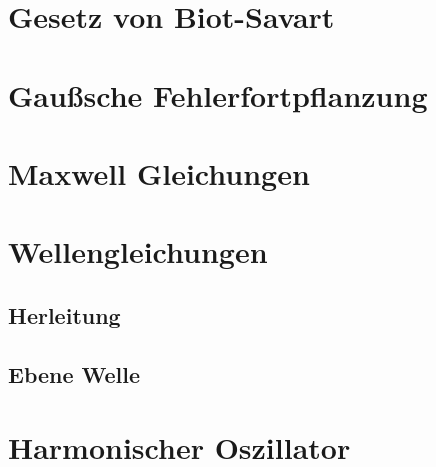 



  \maketitle
  \tableofcontents
  \newpage

    \section{Gesetz von Biot-Savart}
      

    \section{Gaußsche Fehlerfortpflanzung}
      

    \section{Maxwell Gleichungen}
      

    \section{Wellengleichungen}

      \subsection{Herleitung}
        
      \subsection{Ebene Welle}
        
        
    \section{Harmonischer Oszillator}
      


